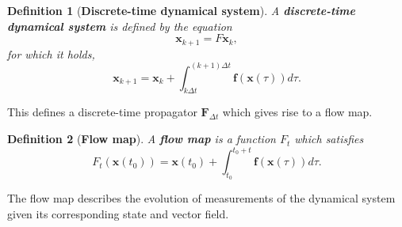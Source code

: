 \documentclass[]{article}
\newtheorem{definition}{Definition}
\begin{document}
\begin{definition}[\textbf{Discrete-time dynamical system}]
A \textbf{discrete-time dynamical system} is defined by the equation 
\begin{equation}
	\textbf{x}_{k+1} = F \textbf{x}_k,
\end{equation}
for which it holds,
\begin{equation}
	\textbf{x}_{k+1} = \textbf{x}_k + \int_{k \Delta t}^{(k+1)\Delta t} \textbf{f}(\textbf{x}(\tau)) d\tau.
\end{equation}
\end{definition}
This defines a discrete-time propagator $\textbf{F}_{\Delta t}$ which gives rise to a flow map.
\begin{definition}[\textbf{Flow map}]
A \textbf{flow map} is a function $F_t$ which satisfies
\begin{equation}
	F_t(\textbf{x}(t_0)) = \textbf{x}(t_0) + \int_{t_0}^{t_0+t} \textbf{f}(\textbf{x}(\tau)) d\tau.
\end{equation}
\end{definition}
The flow map describes the evolution of measurements of the dynamical system given its corresponding state and vector field.
\end{document}
